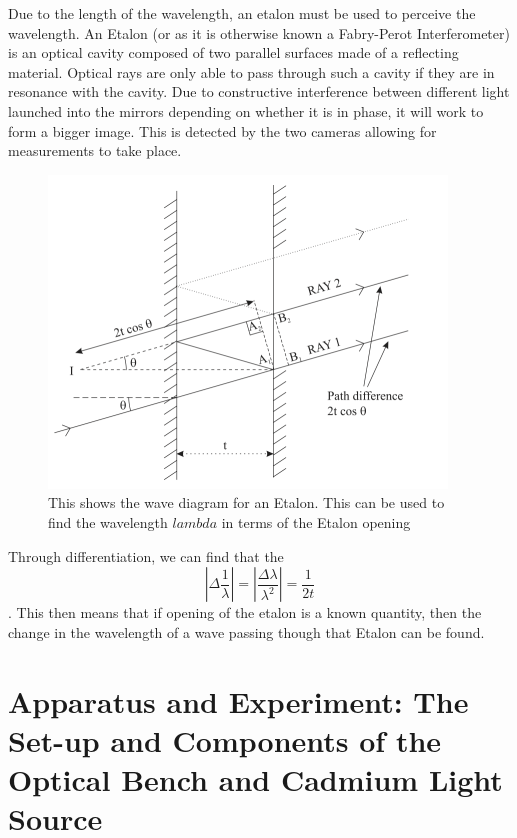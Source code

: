 \documentclass[a4paper,11pt]{article}
\begin{document}
Due to the length of the wavelength, an etalon must be used to perceive the wavelength. An Etalon (or as it is otherwise known a Fabry-Perot Interferometer) is an optical cavity composed of two parallel surfaces made of a reflecting material. Optical rays are only able to pass through such a cavity if they are in resonance with the cavity. Due to constructive interference between different light launched into the mirrors depending on whether it is in phase, it will work to form a bigger image. This is detected by the two cameras allowing for measurements to take place. \cite{Etalon}
\begin{figure}[hbt!]
    \centering
    \includegraphics[width=0.5\columnwidth]{Images/tonk.png}
    \caption{This shows the wave diagram for an Etalon. This can be used to find the wavelength $lambda$ in terms of the Etalon opening} %
    \label{fig:my_label}
\end{figure}
 
 Through differentiation, we can find that the $$|\Delta \frac{1}{\lambda}|=|\frac{\Delta \lambda}{\lambda ^2}|=\frac{1}{2t}$$. This then means that if opening of the etalon is a known quantity, then the change in the wavelength of a wave passing though that Etalon can be found. 

\section{Apparatus and Experiment: The Set-up and Components of the Optical Bench and Cadmium Light Source }
\end{document}
